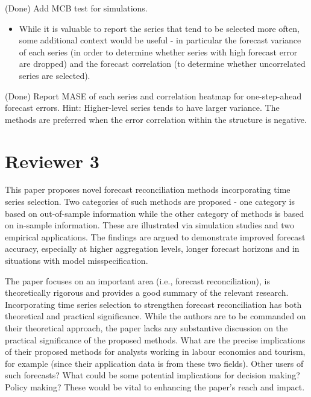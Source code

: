 \documentclass[11pt,a4paper,]{article}
\providecommand{\tightlist}{%
  \setlength{\itemsep}{0pt}\setlength{\parskip}{0pt}}
\renewenvironment{quote}
               {\list{}{\rightmargin\leftmargin}%
                \item\relax\color[RGB]{0,150,0}}
               {\endlist}
\begin{document}
\begin{quote}
(Done) Add MCB test for simulations.
\end{quote}

\begin{itemize}
\tightlist
\item
  While it is valuable to report the series that tend to be selected
  more often, some additional context would be useful - in particular
  the forecast variance of each series (in order to determine whether
  series with high forecast error are dropped) and the forecast
  correlation (to determine whether uncorrelated series are selected).
\end{itemize}

\begin{quote}
(Done) Report MASE of each series and correlation heatmap for
one-step-ahead forecast errors. Hint: Higher-level series tends to have
larger variance. The methods are preferred when the error correlation
within the structure is negative.
\end{quote}

\section*{Reviewer 3}\label{reviewer-3}

This paper proposes novel forecast reconciliation methods incorporating
time series selection. Two categories of such methods are proposed - one
category is based on out-of-sample information while the other category
of methods is based on in-sample information. These are illustrated via
simulation studies and two empirical applications. The findings are
argued to demonstrate improved forecast accuracy, especially at higher
aggregation levels, longer forecast horizons and in situations with
model misspecification.

The paper focuses on an important area (i.e., forecast reconciliation),
is theoretically rigorous and provides a good summary of the relevant
research. Incorporating time series selection to strengthen forecast
reconciliation has both theoretical and practical significance. While
the authors are to be commanded on their theoretical approach, the paper
lacks any substantive discussion on the practical significance of the
proposed methods. What are the precise implications of their proposed
methods for analysts working in labour economics and tourism, for
example (since their application data is from these two fields). Other
users of such forecasts? What could be some potential implications for
decision making? Policy making? These would be vital to enhancing the
paper's reach and impact.
\end{document}
